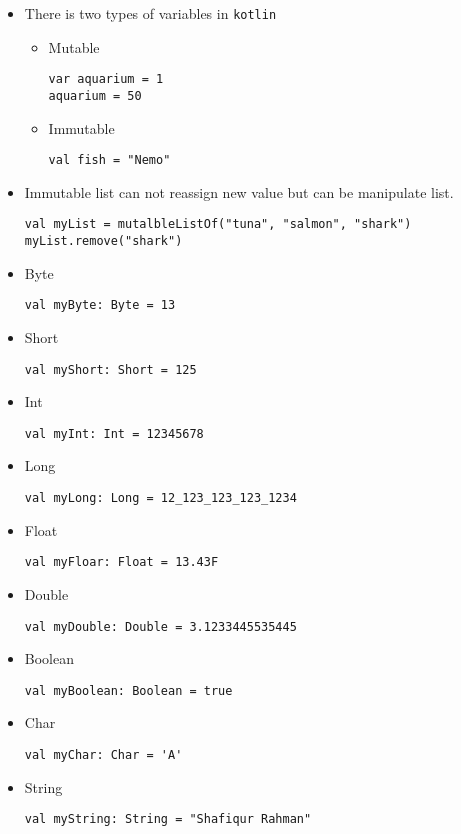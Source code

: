 \documentclass[11pt]{article}
\begin{document}
\begin{itemize}
\item There is two types of variables in \texttt{kotlin}
\begin{itemize}
\item Mutable
\begin{verbatim}
var aquarium = 1
aquarium = 50
\end{verbatim}

\item Immutable 
\begin{verbatim}
val fish = "Nemo"
\end{verbatim}
\end{itemize}

\item Immutable list can not reassign new value but can be manipulate
list.
\begin{verbatim}
val myList = mutalbleListOf("tuna", "salmon", "shark")
myList.remove("shark")
\end{verbatim}

\item Byte
\begin{verbatim}
val myByte: Byte = 13
\end{verbatim}

\item Short
\begin{verbatim}
val myShort: Short = 125
\end{verbatim}

\item Int
\begin{verbatim}
val myInt: Int = 12345678
\end{verbatim}

\item Long
\begin{verbatim}
val myLong: Long = 12_123_123_123_1234
\end{verbatim}

\item Float
\begin{verbatim}
val myFloar: Float = 13.43F
\end{verbatim}

\item Double
\begin{verbatim}
val myDouble: Double = 3.1233445535445
\end{verbatim}

\item Boolean
\begin{verbatim}
val myBoolean: Boolean = true
\end{verbatim}

\item Char
\begin{verbatim}
val myChar: Char = 'A'
\end{verbatim}

\item String
\begin{verbatim}
val myString: String = "Shafiqur Rahman"
\end{verbatim}
\end{itemize}
\end{document}
